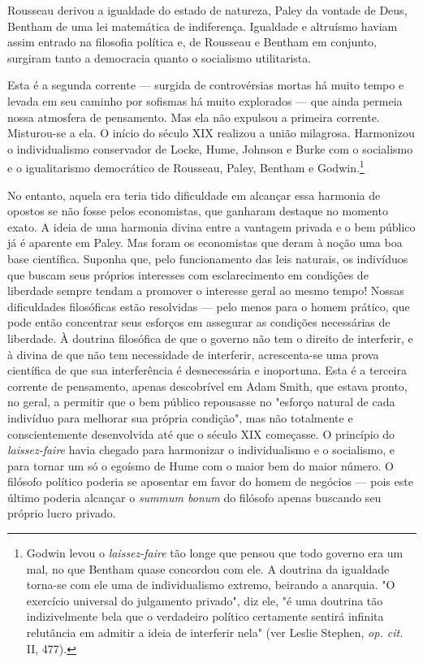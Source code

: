 \documentclass[12pt]{article}
\begin{document}
Rousseau derivou a igualdade do estado de natureza, Paley da vontade de Deus, Bentham de uma lei matemática de indiferença. Igualdade e altruísmo haviam assim entrado na filosofia política e, de Rousseau e Bentham em conjunto, surgiram tanto a democracia quanto o socialismo utilitarista.

Esta é a segunda corrente — surgida de controvérsias mortas há muito tempo e levada em seu caminho por sofismas há muito explorados — que ainda permeia nossa atmosfera de pensamento. Mas ela não expulsou a primeira corrente. Misturou-se a ela. O início do século XIX realizou a união milagrosa. Harmonizou o individualismo conservador de Locke, Hume, Johnson e Burke com o socialismo e o igualitarismo democrático de Rousseau, Paley, Bentham e Godwin.\footnote{Godwin levou o \textit{laissez-faire} tão longe que pensou que todo governo era um mal, no que Bentham quase concordou com ele. A doutrina da igualdade torna-se com ele uma de individualismo extremo, beirando a anarquia. "O exercício universal do julgamento privado", diz ele, "é uma doutrina tão indizivelmente bela que o verdadeiro político certamente sentirá infinita relutância em admitir a ideia de interferir nela" (ver Leslie Stephen, \textit{op. cit.} II, 477).}

No entanto, aquela era teria tido dificuldade em alcançar essa harmonia de opostos se não fosse pelos economistas, que ganharam destaque no momento exato. A ideia de uma harmonia divina entre a vantagem privada e o bem público já é aparente em Paley. Mas foram os economistas que deram à noção uma boa base científica. Suponha que, pelo funcionamento das leis naturais, os indivíduos que buscam seus próprios interesses com esclarecimento em condições de liberdade sempre tendam a promover o interesse geral ao mesmo tempo! Nossas dificuldades filosóficas estão resolvidas — pelo menos para o homem prático, que pode então concentrar seus esforços em assegurar as condições necessárias de liberdade. À doutrina filosófica de que o governo não tem o direito de interferir, e à divina de que não tem necessidade de interferir, acrescenta-se uma prova científica de que sua interferência é desnecessária e inoportuna. Esta é a terceira corrente de pensamento, apenas descobrível em Adam Smith, que estava pronto, no geral, a permitir que o bem público repousasse no "esforço natural de cada indivíduo para melhorar sua própria condição", mas não totalmente e conscientemente desenvolvida até que o século XIX começasse. O princípio do \textit{laissez-faire} havia chegado para harmonizar o individualismo e o socialismo, e para tornar um só o egoísmo de Hume com o maior bem do maior número. O filósofo político poderia se aposentar em favor do homem de negócios — pois este último poderia alcançar o \textit{summum bonum} do filósofo apenas buscando seu próprio lucro privado.
\end{document}
